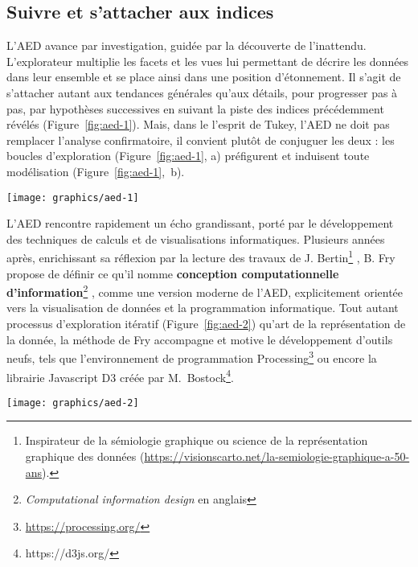 \documentclass[symmetric,justified,marginals=raggedouter]{tufte-book}
\begin{document}
\subsection{Suivre et s'attacher aux indices}

\noindent L'AED avance par investigation, guidée par la découverte de l'inattendu. L'explorateur multiplie les facets et les vues lui permettant de décrire les données dans leur ensemble et se place ainsi dans une position d'étonnement. Il s'agit de s'attacher autant aux tendances générales qu'aux détails, pour progresser pas à pas, par hypothèses successives en suivant la piste des indices précédemment révélés (Figure~\ref{fig:aed-1}). Mais, dans le l'esprit de Tukey, l'AED ne doit pas remplacer l'analyse confirmatoire, il convient plutôt de conjuguer les deux : les boucles d'exploration (Figure~\ref{fig:aed-1}, a) préfigurent et induisent toute modélisation (Figure~\ref{fig:aed-1},~b). 

\newpage

\begin{figure*}%
  \texttt{[image: graphics/aed-1]}
  \caption{L'analyse exploratoire et les diverses phases de l'exploration préfigurent toute analyse confirmatoire}
  \label{fig:aed-1}
\end{figure*} 

\noindent L'AED rencontre rapidement un écho grandissant, porté par le dé\-veloppement des techniques de calculs et de visualisations informatiques. Plusieurs années après, enrichissant sa réflexion par la lecture des travaux de J. Bertin\footnote{\RaggedOuter Inspirateur de la sémiologie graphique ou science de la représentation graphique des données (\url{https://visionscarto.net/la-semiologie-graphique-a-50-ans}).} \citep{bertin_semiologie_1967}, B. Fry propose de définir ce qu'il nomme \textbf{conception computationnelle d'information}\footnote{\RaggedOuter \textit{Computational information design} en anglais} \citep{fry_computational_2004}, comme une version moderne de l'AED, explicitement orientée vers la visualisation de données et la programmation informatique. Tout autant processus d'exploration itératif (Figure~\ref{fig:aed-2}) qu'art de la représentation de la donnée, la méthode de Fry accompagne et motive le dé\-veloppement d'outils neufs, tels que l'environnement de programmation Processing\footnote{\RaggedOuter \url{https://processing.org/}} ou encore la librairie Javascript D3 créée par M.~Bostock\footnote{\RaggedOuter https://d3js.org/}.

\begin{figure*}%
  \texttt{[image: graphics/aed-2]}
  \caption{Étapes de la conception computationnelle d'information et ensemble des boucles d'analyses possibles selon \citep{fry_computational_2004}}
  \label{fig:aed-2}
\end{figure*} 
\end{document}
